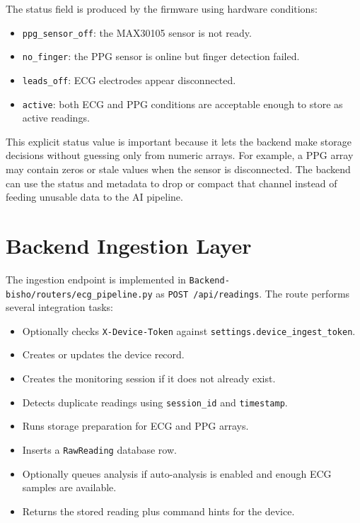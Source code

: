 The status field is produced by the firmware using hardware conditions:

\begin{itemize}
    \item \texttt{ppg\_sensor\_off}: the MAX30105 sensor is not ready.
    \item \texttt{no\_finger}: the PPG sensor is online but finger detection failed.
    \item \texttt{leads\_off}: ECG electrodes appear disconnected.
    \item \texttt{active}: both ECG and PPG conditions are acceptable enough to store as active readings.
\end{itemize}

This explicit status value is important because it lets the backend make storage decisions without guessing only from numeric arrays. For example, a PPG array may contain zeros or stale values when the sensor is disconnected. The backend can use the status and metadata to drop or compact that channel instead of feeding unusable data to the AI pipeline.

\section{Backend Ingestion Layer}

The ingestion endpoint is implemented in \texttt{Backend-bisho/routers/ecg\_pipeline.py} as \texttt{POST /api/readings}. The route performs several integration tasks:

\begin{itemize}
    \item Optionally checks \texttt{X-Device-Token} against \texttt{settings.device\_ingest\_token}.
    \item Creates or updates the device record.
    \item Creates the monitoring session if it does not already exist.
    \item Detects duplicate readings using \texttt{session\_id} and \texttt{timestamp}.
    \item Runs storage preparation for ECG and PPG arrays.
    \item Inserts a \texttt{RawReading} database row.
    \item Optionally queues analysis if auto-analysis is enabled and enough ECG samples are available.
    \item Returns the stored reading plus command hints for the device.
\end{itemize}

